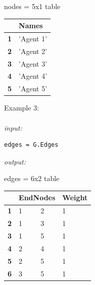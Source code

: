 \documentclass[../MATLAB_Primer.tex]{subfiles}
\begin{document}
\begin{center}
   nodes = 5x1 table 
\end{center}

\begin{table}[H]

    \begin{center}
        \begin{tabular}{|l|l|}
            \hline
             & \textbf{Names}\\
            
            \hline
            \textbf{1} & 'Agent 1' \\
            \hline
            \textbf{2} & 'Agent 2' \\
            \hline
            \textbf{3} & 'Agent 3' \\
            \hline
            \textbf{4} & 'Agent 4' \\
            \hline
            \textbf{5} & 'Agent 5' \\
            \hline
        \end{tabular}
    \end{center}
\end{table}

Example 3:
\\ \\
\textit{input:}
\begin{lstlisting}
edges = G.Edges

\end{lstlisting}
\textit{output:}

\begin{center}
   edges = 6x2 table 
\end{center}

\begin{table}[H]

    \begin{center}
        \begin{tabular}{|l|l|l|l|}
            \hline
            
             & \multicolumn{2}{l|}{\textbf{EndNodes}} & \textbf{Weight}\\
            
            \hline
            \textbf{1} & 1 & 2 & 1 \\
            \hline
            \textbf{2} & 1 & 3 & 1 \\
            \hline
            \textbf{3} & 1 & 5 & 1 \\
            \hline
            \textbf{4} & 2 & 4 & 1 \\
            \hline
            \textbf{5} & 2 & 5 & 1 \\
            \hline
            \textbf{6} & 3 & 5 & 1 \\
            \hline
        \end{tabular}
    \end{center}
\end{table}
\end{document}
